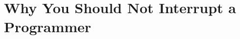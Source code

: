 \documentclass[11pt,singleside]{myfithesis2}
\begin{document}
\appendix

\chapter{Why You Should Not Interrupt a Programmer}\label{app:programmer}
%
\begin{figure}[htp] 
\cite{programmerInterrupted}
\end{figure}  
\end{document}
